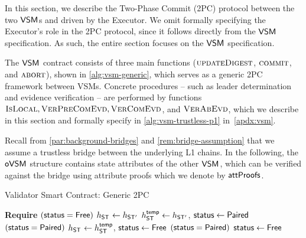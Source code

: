 In this section, we describe the Two-Phase Commit (2PC) protocol between the two $\mathsf{VSM}_{}$s and driven by the Executor. We omit formally specifying the Executor's role in the 2PC protocol, since it follows directly from the $\mathsf{VSM}_{}$ specification. As such, the entire section focuses on the $\mathsf{VSM}_{}$ specification.


The $\mathsf{VSM}_{}$ contract consists of three main functions ($\textproc{updateDigest}$, $\textproc{commit}$, and $\textproc{abort}$), shown in \cref{alg:vsm-generic}, which serves as a generic 2PC framework between VSMs. Concrete procedures -- such as leader determination and evidence verification -- are performed by functions $\textproc{IsLocal}, \textproc{VerPreComEvd}, \textproc{VerComEvd}$, and $\textproc{VerAbEvd}$, which we describe in this section and formally specify in \cref{alg:vsm-trustless-p1} in~\cref{apdx:vsm}.

Recall from \cref{par:background-bridges} and \cref{rem:bridge-assumption} that we assume a trustless bridge between the underlying L1 chains. In the following, the $\mathsf{oVSM}$ structure contains state attributes of the other $\mathsf{VSM}_{}$, which can be verified against the bridge using attribute proofs which we denote by $\mathsf{attProofs}$. 

\begin{algorithm}[ht]
    \small
    \caption{Validator Smart Contract: Generic 2PC}
    \label{alg:vsm-generic}
    \begin{algorithmic}[1] %

            \State \textbf{Require} $(\mathsf{status} = \mathsf{Free})$
            \State {}
             \; $h_{\mathsf{ST_{}}} \gets h_{\mathsf{ST_{}'}}$
            \Else
                \State {}
                \State $h_{\mathsf{ST_{}}}^{\mathsf{temp}} \gets h_{\mathsf{ST_{}'}}$, \; $\mathsf{status} \gets \mathsf{Paired}$
            \EndIf
        \EndFunction
            \State \require $(\mathsf{status} = \mathsf{Paired})$
            \State {}
            \State $h_{\mathsf{ST_{}}} \gets h_{\mathsf{ST_{}}}^{\mathsf{temp}}$, \; $\mathsf{status} \gets \mathsf{Free}$
        \EndFunction
            \State \require $(\mathsf{status} = \mathsf{Paired})$
            \State {}
            \State $\mathsf{status} \gets \mathsf{Free}$
        \EndFunction
    \end{algorithmic}
\end{algorithm}


